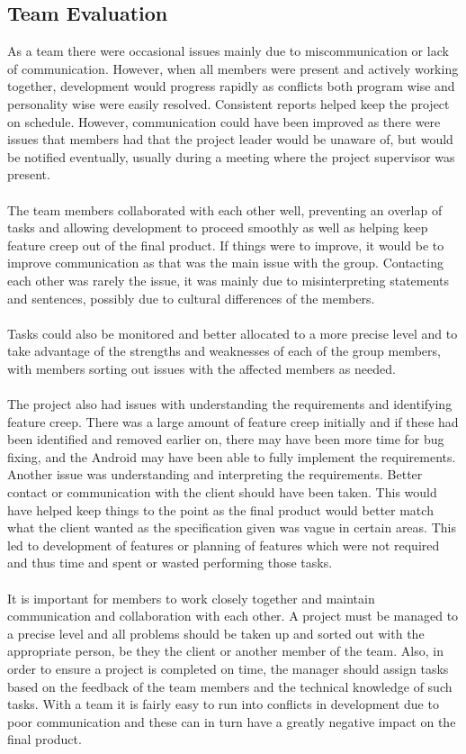 \documentclass[12pt]{article}
\begin{document}
\subsection{Team Evaluation}
As a team there were occasional issues mainly due to miscommunication or lack of communication. However, when all members were present and actively working together, development would progress rapidly as conflicts both program wise and personality wise were easily resolved. Consistent reports helped keep the project on schedule. However, communication could have been improved as there were issues that members had that the project leader would be unaware of, but would be notified eventually, usually during a meeting where the project supervisor was present. 
~\\\\
The team members collaborated with each other well, preventing an overlap of tasks and allowing development to proceed smoothly as well as helping keep feature creep out of the final product. If things were to improve, it would be to improve communication as that was the main issue with the group. Contacting each other was rarely the issue, it was mainly due to misinterpreting statements and sentences, possibly due to cultural differences of the members.
~\\\\
Tasks could also be monitored and better allocated to a more precise level and to take advantage of the strengths and weaknesses of each of the group members, with members sorting out issues with the affected members as needed.
~\\\\
The project also had issues with understanding the requirements and identifying feature creep. There was a large amount of feature creep initially and if these had been identified and removed earlier on, there may have been more time for bug fixing, and the Android may have been able to fully implement the requirements. Another issue was understanding and interpreting the requirements. Better contact or communication with the client should have been taken. This would have helped keep things to the point as the final product would better match what the client wanted as the specification given was vague in certain areas. This led to development of features or planning of features which were not required and thus time and spent or wasted performing those tasks.
~\\\\
It is important for members to work closely together and maintain communication and collaboration with each other. A project must be managed to a precise level and all problems should be taken up and sorted out with the appropriate person, be they the client or another member of the team. Also, in order to ensure a project is completed on time, the manager should assign tasks based on the feedback of the team members and the technical knowledge of such tasks. With a team it is fairly easy to run into conflicts in development due to poor communication and these can in turn have a greatly negative impact on the final product.
\newpage
\end{document}
